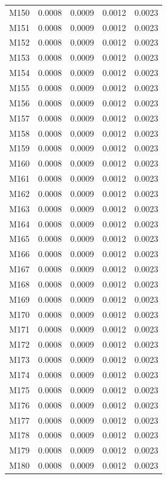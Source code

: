 \begin{longtable}{lrrrr}
M150 & 0.0008 & 0.0009 & 0.0012 & 0.0023 \\
M151 & 0.0008 & 0.0009 & 0.0012 & 0.0023 \\
M152 & 0.0008 & 0.0009 & 0.0012 & 0.0023 \\
M153 & 0.0008 & 0.0009 & 0.0012 & 0.0023 \\
M154 & 0.0008 & 0.0009 & 0.0012 & 0.0023 \\
M155 & 0.0008 & 0.0009 & 0.0012 & 0.0023 \\
M156 & 0.0008 & 0.0009 & 0.0012 & 0.0023 \\
M157 & 0.0008 & 0.0009 & 0.0012 & 0.0023 \\
M158 & 0.0008 & 0.0009 & 0.0012 & 0.0023 \\
M159 & 0.0008 & 0.0009 & 0.0012 & 0.0023 \\
M160 & 0.0008 & 0.0009 & 0.0012 & 0.0023 \\
M161 & 0.0008 & 0.0009 & 0.0012 & 0.0023 \\
M162 & 0.0008 & 0.0009 & 0.0012 & 0.0023 \\
M163 & 0.0008 & 0.0009 & 0.0012 & 0.0023 \\
M164 & 0.0008 & 0.0009 & 0.0012 & 0.0023 \\
M165 & 0.0008 & 0.0009 & 0.0012 & 0.0023 \\
M166 & 0.0008 & 0.0009 & 0.0012 & 0.0023 \\
M167 & 0.0008 & 0.0009 & 0.0012 & 0.0023 \\
M168 & 0.0008 & 0.0009 & 0.0012 & 0.0023 \\
M169 & 0.0008 & 0.0009 & 0.0012 & 0.0023 \\
M170 & 0.0008 & 0.0009 & 0.0012 & 0.0023 \\
M171 & 0.0008 & 0.0009 & 0.0012 & 0.0023 \\
M172 & 0.0008 & 0.0009 & 0.0012 & 0.0023 \\
M173 & 0.0008 & 0.0009 & 0.0012 & 0.0023 \\
M174 & 0.0008 & 0.0009 & 0.0012 & 0.0023 \\
M175 & 0.0008 & 0.0009 & 0.0012 & 0.0023 \\
M176 & 0.0008 & 0.0009 & 0.0012 & 0.0023 \\
M177 & 0.0008 & 0.0009 & 0.0012 & 0.0023 \\
M178 & 0.0008 & 0.0009 & 0.0012 & 0.0023 \\
M179 & 0.0008 & 0.0009 & 0.0012 & 0.0023 \\
M180 & 0.0008 & 0.0009 & 0.0012 & 0.0023 \\

\end{longtable}
